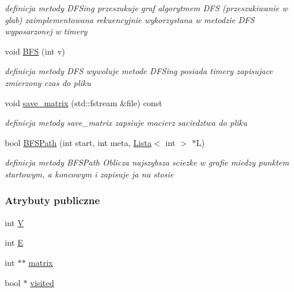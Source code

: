 \begin{DoxyCompactItemize}
\begin{DoxyCompactList}\small\item\em definicja metody D\+F\+Sing przeszukuje graf algorytmem D\+F\+S (przeszukiwanie w glab) zaimplementowana rekuencyjnie wykorzystana w metodzie D\+F\+S wyposarzonej w timery \end{DoxyCompactList}\item 
void \hyperlink{class_c_graph_a7959dedbebc0e036672eae63e25e96eb}{B\+F\+S} (int v)
\begin{DoxyCompactList}\small\item\em definicja metody D\+F\+S wywoluje metode D\+F\+Sing posiada timery zapisujace zmierzony czas do pliku \end{DoxyCompactList}\item 
void \hyperlink{class_c_graph_a3af9d81bcc5baf54d713a78713d164de}{save\+\_\+matrix} (std\+::fstream \&file) const 
\begin{DoxyCompactList}\small\item\em definicja metody save\+\_\+matrix zapsiuje macierz saciedztwa do pliku \end{DoxyCompactList}\item 
bool \hyperlink{class_c_graph_a34997383af6ab4eb69372f7f1259f2e8}{B\+F\+S\+Path} (int start, int meta, \hyperlink{class_lista}{Lista}$<$ int $>$ $\ast$L)
\begin{DoxyCompactList}\small\item\em definicja metody B\+F\+S\+Path Oblicza najszybsza sciezke w grafie miedzy punktem startowym, a koncowym i zapisuje ja na stosie \end{DoxyCompactList}\end{DoxyCompactItemize}
\subsubsection*{Atrybuty publiczne}
\begin{DoxyCompactItemize}
\item 
int \hyperlink{class_c_graph_a76914f22c12c93e293c392342a4a233c}{V}
\item 
int \hyperlink{class_c_graph_a2bd3b0ae57901636d327bc7a6fdab545}{E}
\item 
int $\ast$$\ast$ \hyperlink{class_c_graph_a53c8f8a69d4d041b8b7557b5fece2f58}{matrix}
\item 
bool $\ast$ \hyperlink{class_c_graph_a8478f38bd0487246450f933dc4403227}{visited}
\end{DoxyCompactItemize}


